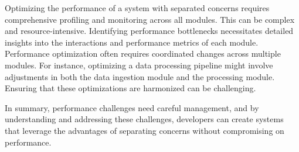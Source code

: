 \par
Optimizing the performance of a system with separated concerns requires comprehensive profiling and monitoring across all modules. This can be complex and resource-intensive. Identifying performance bottlenecks necessitates detailed insights into the interactions and performance metrics of each module.
Performance optimization often requires coordinated changes across multiple modules. For instance, optimizing a data processing pipeline might involve adjustments in both the data ingestion module and the processing module. Ensuring that these optimizations are harmonized can be challenging.
\par
In summary, performance challenges  need careful management, and by understanding and addressing these challenges, developers can create systems that leverage the advantages of separating concerns without compromising on performance.

